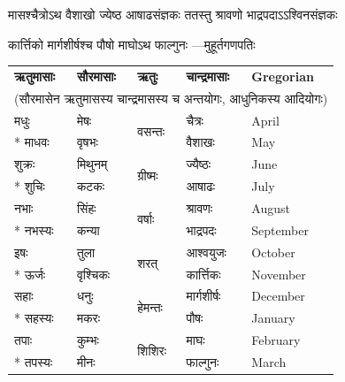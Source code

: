 \label{app:masa_names}


\addtocounter{shlokacount}{27}
\twolineshloka
{मासश्चैत्रोऽथ वैशाखो ज्येष्ठ आषाढसंज्ञकः}
{ततस्तु श्रावणो भाद्रपदाऽऽश्विनसंज्ञकः}

\onelineshloka
{कार्त्तिको मार्गशीर्षश्च पौषो माघोऽथ फाल्गुनः}
\hfill{}—मुहूर्तगणपतिः

\begin{longtable}{lllll}
  \textbf{ऋतुमासाः} & \textbf{सौरमासाः} & \textbf{ऋतुः}    & \textbf{चान्द्रमासाः} & \textsf{\normalsize \textbf{Gregorian}} \\
  \multicolumn{5}{c}{\small (सौरमासेन ऋतुमासस्य चान्द्रमासस्य च अन्तयोगः, आधुनिकस्य आदियोगः)}\\\hline\endhead
  मधुः     & मेषः      & \multirow{2}{*}{वसन्तः}  & चैत्रः       & \textsf{\normalsize April}    \\*
  माधवः   & वृषभः     &   & वैशाखः      & \textsf{\normalsize May}       \\\hline
  शुक्रः    & मिथुनम्    & \multirow{2}{*}{ग्रीष्मः} & ज्यैष्ठः      & \textsf{\normalsize June}    \\*
  शुचिः    & कटकः     &  & आषाढः      & \textsf{\normalsize July}      \\\hline
  नभाः    & सिंहः     & \multirow{2}{*}{वर्षाः}  & श्रावणः     & \textsf{\normalsize August}     \\*
  नभस्यः   & कन्या     &   & भाद्रपदः    & \textsf{\normalsize September} \\\hline
  इषः     & तुला      & \multirow{2}{*}{शरत्}    & आश्वयुजः     & \textsf{\normalsize October}\\*
  ऊर्जः    & वृश्चिकः   &     & कार्त्तिकः   & \textsf{\normalsize November}  \\\hline
  सहाः    & धनुः      & \multirow{2}{*}{हेमन्तः}  & मार्गशीर्षः  & \textsf{\normalsize December}  \\*
  सहस्यः   & मकरः     &   & पौषः       & \textsf{\normalsize January}   \\\hline
  तपाः    & कुम्भः     & \multirow{2}{*}{शिशिरः} & माघः       & \textsf{\normalsize February}  \\*
  तपस्यः   & मीनः     &  & फाल्गुनः     & \textsf{\normalsize March}     \\\hline
\end{longtable}
